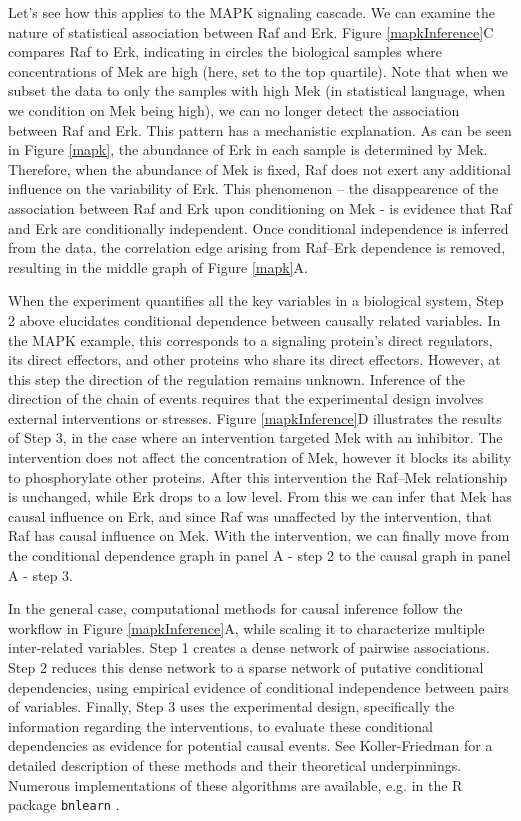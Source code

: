 \documentclass[journal=jacsat,manuscript=article]{achemso}
\begin{document}
Let's see how this applies to the MAPK signaling cascade. We can examine the nature of statistical association between Raf and Erk.  Figure \ref{mapkInference}C compares Raf to Erk, indicating in circles the biological samples where concentrations of Mek are high (here, set to the top quartile).  Note that when we subset the data to only the samples with high Mek (in statistical language, when we condition on Mek being high), we can no longer detect the association between Raf and Erk. This pattern has a mechanistic explanation. As can be seen in Figure \ref{mapk}, the abundance of Erk in each sample is determined by Mek. Therefore, when the abundance of Mek is fixed, Raf does not exert any additional influence on the variability of Erk.  This phenomenon -- the disappearence of the association between Raf and Erk upon conditioning on Mek - is evidence that  Raf and Erk are conditionally independent.  Once conditional independence is inferred from the data, the correlation edge arising from Raf--Erk dependence is removed, resulting in the middle graph of Figure \ref{mapk}A.

When the experiment quantifies all the key variables in a biological system, Step 2 above elucidates conditional dependence between causally related variables. In the MAPK example, this corresponds to a signaling protein's direct regulators, its direct effectors, and other proteins who share its direct effectors.  However, at this step the direction of the regulation remains unknown. Inference of the direction of the chain of events requires that the experimental design involves external interventions or stresses. Figure \ref{mapkInference}D illustrates the results of Step 3, in the case where an intervention targeted Mek with an inhibitor. The intervention does not affect the concentration of Mek, however it blocks its ability to phosphorylate other proteins.  After this intervention the Raf--Mek relationship is unchanged, while Erk drops to a low level.  From this we can infer that Mek has causal influence on Erk, and since Raf was unaffected by the intervention, that Raf has causal influence on Mek.  With the intervention, we can finally move from the conditional dependence graph in panel A - step 2 to the causal graph in panel A - step 3.

In the general case, computational methods for causal inference follow the workflow  in Figure \ref{mapkInference}A, while scaling it to characterize multiple inter-related variables. Step 1 creates a dense network of pairwise associations. Step 2 reduces this dense network to a sparse network of putative conditional dependencies, using empirical evidence of  conditional independence between pairs of variables. Finally, Step 3 uses the experimental design, specifically the information regarding the interventions, to evaluate these conditional dependencies as evidence for potential causal events.  See Koller-Friedman \cite{koller2009probabilistic} for a detailed description of these methods and their theoretical underpinnings. Numerous implementations of these algorithms are available, e.g. in the R package {\tt bnlearn} \cite{scutari2009learning}. 
\end{document}
